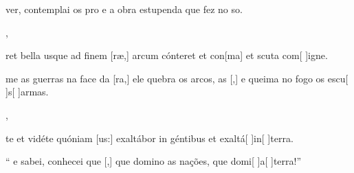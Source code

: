 {    {\item {} ver, contemplai os pro e a obra estupenda que fez no so.~\Antiphona},
  {\item {}ret bella usque ad finem [ræ,] arcum cónteret et con[ma] et scuta com[ ]{i}gne.
      ~\Antiphona}%
    {\item {}me as guerras na face da [ra,] ele quebra os arcos, as [,] e queima no fogo os escu[ ]{s}[ ]{ar}mas.~\Antiphona},
  {\item {}te et vidéte quóniam [us:] exaltábor in géntibus et exaltá[ ]{in}[ ]{ter}ra.~\Antiphona}%
    {\item {}`` e sabei, conhecei que [,] que domino as nações, que domi[ ]{a}[ ]{ter}ra!''~\Antiphona}
}